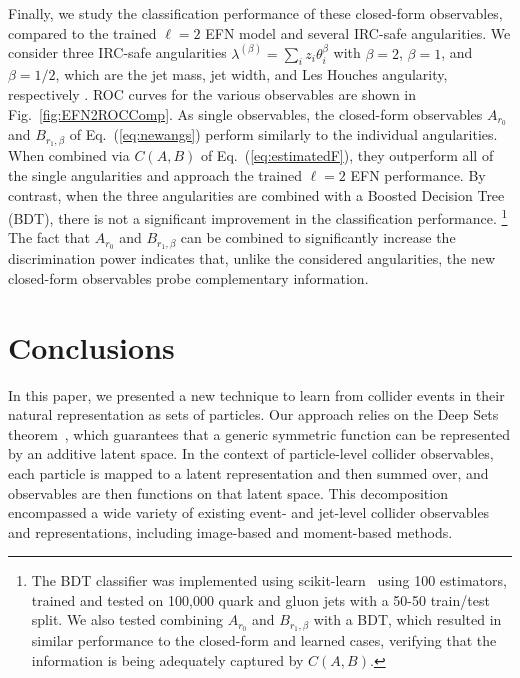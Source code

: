 \documentclass[letterpaper,11pt]{article}
\DeclareRobustCommand{\Fig}[1]{Fig.~\ref{#1}}
\DeclareRobustCommand{\Eq}[1]{Eq.~(\ref{#1})}
\begin{document}
Finally, we study the classification performance of these closed-form observables, compared to the trained $\ell=2$ EFN model and several IRC-safe angularities.
%
We consider three IRC-safe angularities $\lambda^{(\beta)} = \sum_i z_i \theta_i^\beta$ with $\beta=2$, $\beta=1$, and $\beta=1/2$, which are the jet mass, jet width, and Les Houches angularity, respectively \cite{Gras:2017jty}.
%
ROC curves for the various observables are shown in \Fig{fig:EFN2ROCComp}.
%
As single observables, the closed-form observables $A_{r_0}$ and $B_{r_1,\beta}$ of \Eq{eq:newangs} perform similarly to the individual angularities.
%
When combined via $C(A,B)$ of \Eq{eq:estimatedF}, they outperform all of the single angularities and approach the trained $\ell=2$ EFN performance.
%
By contrast, when the three angularities are combined with a Boosted Decision Tree (BDT), there is not a significant improvement in the classification performance.%
%
\footnote{The BDT classifier was implemented using scikit-learn~\cite{scikit-learn} using 100 estimators, trained and tested on 100,000 quark and gluon jets with a 50-50 train/test split.  We also tested combining $A_{r_0}$ and $B_{r_1,\beta}$ with a BDT, which resulted in similar performance to the closed-form and learned cases, verifying that the information is being adequately captured by $C(A,B)$.}
%
The fact that $A_{r_0}$ and $B_{r_1,\beta}$ can be combined to significantly increase the discrimination power indicates that, unlike the considered angularities, the new closed-form observables probe complementary information.



\section{Conclusions}
\label{sec:conc}


In this paper, we presented a new technique to learn from collider events in their natural representation as sets of particles.
%
Our approach relies on the Deep Sets theorem~\cite{DBLP:conf/nips/ZaheerKRPSS17}, which guarantees that a generic symmetric function can be represented by an additive latent space.
%
In the context of particle-level collider observables, each particle is mapped to a latent representation and then summed over, and observables are then functions on that latent space.
%
This decomposition encompassed a wide variety of existing event- and jet-level collider observables and representations, including image-based and moment-based methods.
\end{document}

